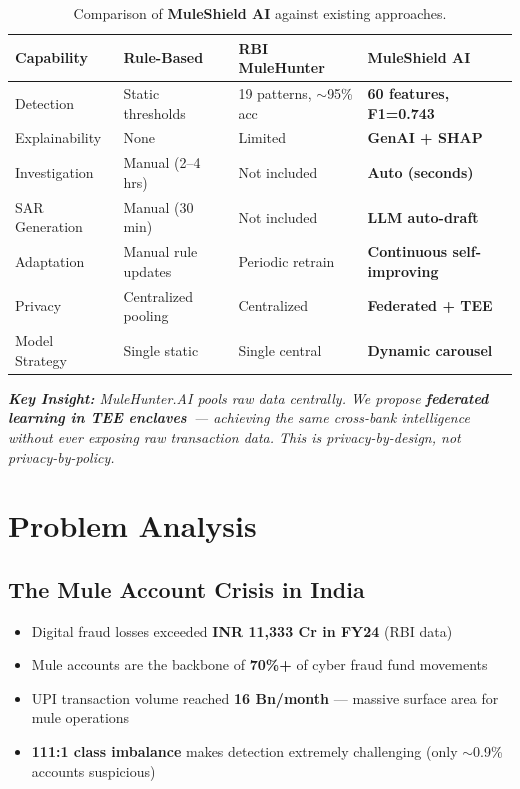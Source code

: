 \documentclass[11pt, a4paper]{article}
\newcommand{\muleshield}{\textbf{\textcolor{mainblue}{MuleShield AI}}}
\begin{document}
\begin{table}[H]
\centering
\small
{}
\begin{tabularx}{\textwidth}{L{2.8cm} Y Y Y}
\toprule
{}
\textbf{Capability} & \textbf{Rule-Based} & \textbf{RBI MuleHunter} & \textbf{MuleShield AI} \\
\midrule
Detection & Static thresholds & 19 patterns, $\sim$95\% acc & \textbf{60 features, F1=0.743} \\
Explainability & None & Limited & \textbf{GenAI + SHAP} \\
Investigation & Manual (2--4 hrs) & Not included & \textbf{Auto (seconds)} \\
SAR Generation & Manual (30 min) & Not included & \textbf{LLM auto-draft} \\
Adaptation & Manual rule updates & Periodic retrain & \textbf{Continuous self-improving} \\
Privacy & Centralized pooling & Centralized & \textbf{Federated + TEE} \\
Model Strategy & Single static & Single central & \textbf{Dynamic carousel} \\
\bottomrule
\end{tabularx}
\caption{Comparison of \muleshield{} against existing approaches.}
\end{table}

\noindent\textit{\textbf{Key Insight:} MuleHunter.AI pools raw data centrally. We propose \textbf{federated learning in TEE enclaves}~--- achieving the same cross-bank intelligence without ever exposing raw transaction data. This is privacy-by-design, not privacy-by-policy.}


\section{Problem Analysis}

\subsection{The Mule Account Crisis in India}

\begin{itemize}
    \item Digital fraud losses exceeded \textbf{INR 11,333 Cr in FY24} (RBI data)
    \item Mule accounts are the backbone of \textbf{70\%+} of cyber fraud fund movements
    \item UPI transaction volume reached \textbf{16 Bn/month} --- massive surface area for mule operations
    \item \textbf{111:1 class imbalance} makes detection extremely challenging (only $\sim$0.9\% accounts suspicious)
\end{itemize}
\end{document}
